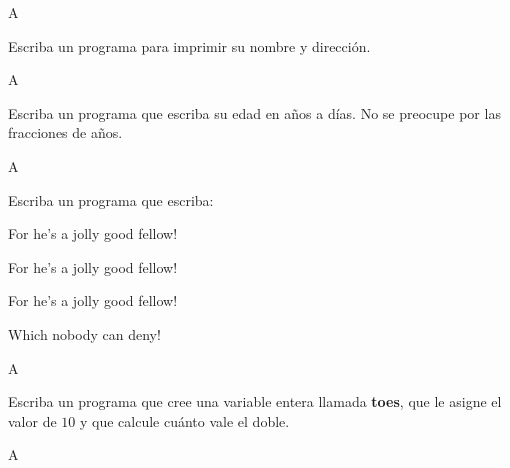 \documentclass[spanish,addpoints,answers,a4paper]{exam}
\begin{document}
\begin{questions}
\begin{solution}
	A
\end{solution}

\question Escriba un programa para imprimir su nombre y dirección.

\begin{solution}
	A
\end{solution}

\question Escriba un programa que escriba su edad en años a días. No se preocupe por las fracciones de años.

\begin{solution}
	A
\end{solution}

\question Escriba un programa que escriba:

For he's a jolly good fellow!

For he's a jolly good fellow!

For he's a jolly good fellow!

Which nobody can deny!

\begin{solution}
	A
\end{solution}

\question Escriba un programa que cree una variable entera llamada \textbf{toes}, que le asigne el valor de $10$ y que calcule cuánto vale el doble.

\begin{solution}
	A
\end{solution}

\end{questions}
\end{document}

